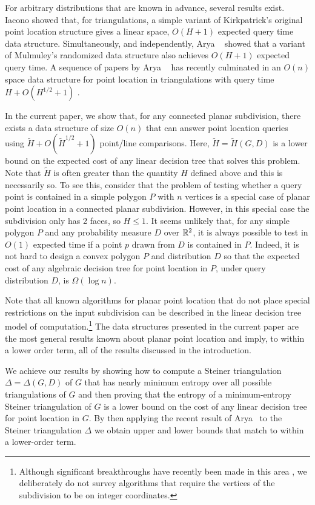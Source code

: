 \documentclass[acmtalg]{acmsmall}
\begin{document}
For arbitrary distributions that are known in advance, several results
exist.  Iacono \cite{i01,i04} showed that, for triangulations, a
simple variant of Kirkpatrick's original point location structure
gives a linear space, $O(H+1)$ expected query time data structure.
Simultaneously, and independently, Arya \etal\ \cite{amm01b} showed
that a variant of Mulmuley's randomized data structure also achieves
$O(H+1)$ expected query time.  A sequence of papers by Arya \etal\
\cite{amm00,amm01a,ammw07} has recently culminated in an $O(n)$ space
data structure for point location in triangulations with query time
$H+O(H^{1/2} + 1)$ \cite{ammw07}.

In the current paper, we show that, for any connected planar
subdivision, there exists a data structure of size $O(n)$ that can
answer point location queries using $\tilde H + O(\tilde H^{1/2}+1)$
point/line comparisons.  Here, $\tilde H=\tilde H(G,D)$ is a lower
bound on the expected cost of any linear decision tree that solves
this problem.  Note that $\tilde H$ is often greater than the quantity
$H$ defined above and this is necessarily so.  To see this, consider
that the problem of testing whether a query point is contained in a
simple polygon $P$ with $n$ vertices is a special case of planar point
location in a connected planar subdivision.  However, in this special
case the subdivision only has 2 faces, so $H\le 1$.  It seems unlikely
that, for any simple polygon $P$ and any probability measure $D$ over $\mathbb{R}^2$,
it is always possible to test in $O(1)$ expected time if a point
$p$ drawn from $D$ is contained in $P$.  Indeed, it is not hard to
design a convex polygon $P$ and distribution $D$ so that the expected
cost of any algebraic decision tree for point location in $P$, under
query distribution $D$, is $\Omega(\log n)$.

Note that all known algorithms for planar point location that do not
place special restrictions on the input subdivision can be described
in the linear decision tree model of computation.\footnote{Although
significant breakthroughs have recently been made in this area
\cite{c06,p06}, we deliberately do not survey algorithms that require
the vertices of the subdivision to be on integer coordinates.}  The
data structures presented in the current paper are the most general
results known about planar point location and imply, to within a
lower order term, all of the results discussed in the introduction.

We achieve our results by showing how to compute a Steiner
triangulation $\Delta=\Delta(G,D)$ of $G$ that has nearly minimum
entropy over all possible triangulations of $G$ and then proving that
the entropy of a minimum-entropy Steiner triangulation of $G$ is a
lower bound on the cost of any linear decision tree for point location
in $G$.  By then applying the recent result of Arya \etal\ to the
Steiner triangulation $\Delta$ we obtain upper and lower bounds that
match to within a lower-order term.
\end{document}
